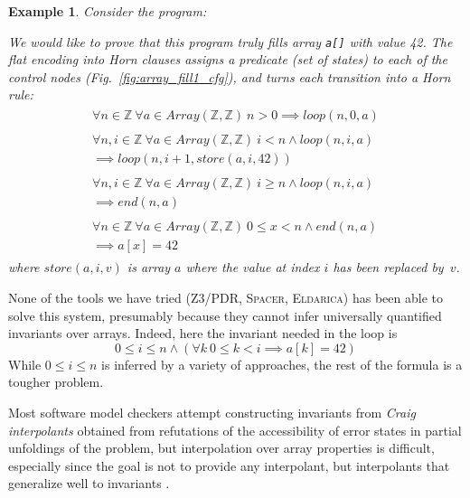\documentclass[a4paper]{article}
\newcommand{\ZZ}{\mathbb{Z}}
\newcommand{\arraytype}[2]{\mathit{Array}\left(#1,#2\right)}
\newcommand{\soft}[1]{\textsc{#1}}
\theoremstyle{definition}
\theoremstyle{plain}
\newtheorem{example}{Example}
\newcommand{\rulespacing}{\\[0.4em]}
\begin{document}
\begin{example}\label{ex:array_fill1}
Consider the program:

We would like to prove that this program truly fills array \lstinline|a[]| with value 42. The flat encoding into Horn clauses assigns a predicate (set of states) to each of the control nodes (Fig.~\ref{fig:array_fill1_cfg}), and turns each transition into a Horn rule:
\begin{align}
\begin{aligned}
\forall n\in\ZZ~ \forall a\in\arraytype{\ZZ}{\ZZ}~ n>0 \implies
  \mathit{loop}(n,0,a)
\end{aligned} \label{equ:array_fill1_arrays_begin}\\
\begin{aligned}
\forall n,i\in\ZZ~ \forall a\in \arraytype{\ZZ}{\ZZ}~
  i<n \land \mathit{loop}(n,i,a) \\
  \implies \mathit{loop}(n,i+1,\mathit{store}(a,i,42))
\end{aligned}\rulespacing
\begin{aligned}
\forall n,i\in\ZZ~ \forall a\in \arraytype{\ZZ}{\ZZ}~
  i\geq n \land \mathit{loop}(n,i,a)\\
  \implies \mathit{end}(n,a)
\end{aligned}\rulespacing
\begin{aligned}
\forall n\in\ZZ~ \forall a\in \arraytype{\ZZ}{\ZZ}~
  0 \leq x < n \land \mathit{end}(n,a) \\
  \implies a[x] = 42
\end{aligned} \label{equ:array_fill1_arrays_end}
\end{align}
where $\mathit{store}(a,i,v)$ is array $a$ where the value at index $i$ has been replaced by~$v$.
\end{example}

None of the tools we have tried (\soft{Z3/PDR}, \soft{Spacer}, \soft{Eldarica}) has been able to solve this system, presumably because they cannot infer universally quantified invariants over arrays.
Indeed, here the invariant needed in the loop is
\begin{equation}
0 \leq i \leq n \land (\forall k~ 0 \leq k < i \implies a[k] = 42)
\end{equation}
While $0 \leq i \leq n$ is inferred by a variety of approaches, the rest of the formula is a tougher problem.

Most software model checkers attempt constructing invariants from \emph{Craig interpolants} obtained from refutations of the accessibility of error states in partial unfoldings of the problem, but interpolation over array properties is difficult,
especially since the goal is not to provide any interpolant, but interpolants that generalize well to invariants \cite{Alberti_Monniaux_SAC-SVT2015,AlbertiBGRS14}.
\end{document}
